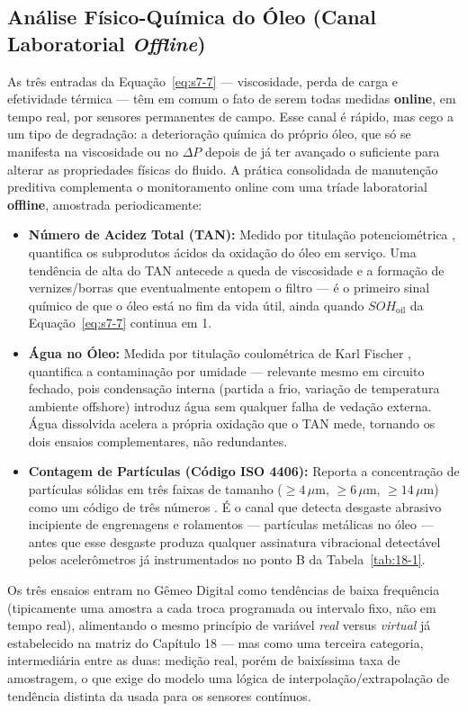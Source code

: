 \documentclass[12pt,a4paper]{article}
\numberwithin{equation}{section}
\numberwithin{table}{section}
\numberwithin{figure}{section}
\begin{document}
{	\subsection{\textbf{Análise Físico-Química do Óleo (Canal Laboratorial \textit{Offline})}}
	As três entradas da Equação~\eqref{eq:s7-7} — viscosidade, perda de carga e efetividade térmica — têm em comum o fato de serem todas medidas \textbf{online}, em tempo real, por sensores permanentes de campo. Esse canal é rápido, mas cego a um tipo de degradação: a deterioração química do próprio óleo, que só se manifesta na viscosidade ou no $\Delta P$ depois de já ter avançado o suficiente para alterar as propriedades físicas do fluido. A prática consolidada de manutenção preditiva \cite{mobley} complementa o monitoramento online com uma tríade laboratorial \textbf{offline}, amostrada periodicamente:
	\begin{itemize}
		\item \textbf{Número de Acidez Total (TAN):} Medido por titulação potenciométrica \cite{astmd664}, quantifica os subprodutos ácidos da oxidação do óleo em serviço. Uma tendência de alta do TAN antecede a queda de viscosidade e a formação de vernizes/borras que eventualmente entopem o filtro — é o primeiro sinal químico de que o óleo está no fim da vida útil, ainda quando $SOH_{\text{oil}}$ da Equação~\eqref{eq:s7-7} continua em 1.
		\item \textbf{Água no Óleo:} Medida por titulação coulométrica de Karl Fischer \cite{astmd6304}, quantifica a contaminação por umidade — relevante mesmo em circuito fechado, pois condensação interna (partida a frio, variação de temperatura ambiente offshore) introduz água sem qualquer falha de vedação externa. Água dissolvida acelera a própria oxidação que o TAN mede, tornando os dois ensaios complementares, não redundantes.
		\item \textbf{Contagem de Partículas (Código ISO 4406):} Reporta a concentração de partículas sólidas em três faixas de tamanho ($\ge 4\,\mu\text{m}$, $\ge 6\,\mu\text{m}$, $\ge 14\,\mu\text{m}$) como um código de três números \cite{iso4406}. É o canal que detecta desgaste abrasivo incipiente de engrenagens e rolamentos — partículas metálicas no óleo — antes que esse desgaste produza qualquer assinatura vibracional detectável pelos acelerômetros já instrumentados no ponto B da Tabela~\ref{tab:18-1}.
	\end{itemize}
	Os três ensaios entram no Gêmeo Digital como tendências de baixa frequência (tipicamente uma amostra a cada troca programada ou intervalo fixo, não em tempo real), alimentando o mesmo princípio de variável \textit{real} versus \textit{virtual} já estabelecido na matriz do Capítulo 18 — mas como uma terceira categoria, intermediária entre as duas: medição real, porém de baixíssima taxa de amostragem, o que exige do modelo uma lógica de interpolação/extrapolação de tendência distinta da usada para os sensores contínuos.

}
\end{document}
